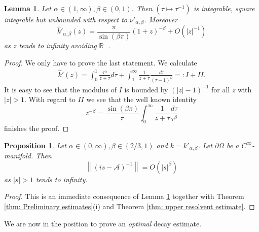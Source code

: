 \documentclass{amsart}
\newcommand{\abs}[1]{\left|#1\right|}
\newcommand{\norm}[1]{\left\| #1 \right\|}
\newcommand{\A}{\mathcal{A}}
\newcommand{\khat}{\hat{k}}
\newcommand{\R}{\mathbb{R}}
\newtheorem{Proposition}[Theorem]{Proposition}
\newtheorem{Lemma}[Theorem]{Lemma}
\begin{document}
  \begin{Lemma}\label{lem: visco kalphabeta}
   Let $\alpha\in(1,\infty),\beta\in(0,1)$. Then $(\tau\mapsto\tau^{-1})$ is integrable, square integrable but unbounded with respect to $\nu'_{\alpha,\beta}$. Moreover
   \begin{equation}\nonumber
    \khat'_{\alpha,\beta}(z) = \frac{\pi}{\sin(\beta\pi)} (1+z)^{-\beta} + O(\abs{z}^{-1})
   \end{equation}
   as $z$ tends to infinity avoiding $\R_-$.
  \end{Lemma}

  \begin{proof}
   We only have to prove the last statement. We calculate
   \begin{align*}
    \khat'(z) = \int_0^1 \frac{\tau^{\alpha}}{z+\tau} d\tau + \int_1^{\infty} \frac{1}{z+\tau} \frac{d\tau}{(\tau-1)^{\beta}} 
    =: I + II.
   \end{align*}
   It is easy to see that the modulus of $I$ is bounded by $(\abs{z}-1)^{-1}$ for all $z$ with $\abs{z} > 1$. With regard to $II$ we see that the well known identity 
   \begin{equation}\nonumber
    z^{-\beta} = \frac{\sin(\beta \pi)}{\pi} \int_0^{\infty} \frac{1}{z+\tau} \frac{d\tau}{\tau^{\beta}}
   \end{equation}
   finishes the proof.
  \end{proof}

  \begin{Proposition}\label{prop: visco singularity at infinity}
   Let $\alpha\in(0,\infty), \beta\in(2/3,1)$ and $k=k'_{\alpha,\beta}$. Let $\partial\Omega$ be a $C^\infty$-manifold. Then
   \begin{equation}\nonumber
    \norm{(is-\A)^{-1}} = O(\abs{s}^{\beta})
   \end{equation}
   as $\abs{s}>1$ tends to infinity.
  \end{Proposition}
  
  \begin{proof}
   This is an immediate consequence of Lemma \ref{lem: visco kalphabeta} together with Theorem \ref{thm: Preliminary estimates}(i) and Theorem \ref{thm: upper resolvent estimate}.
  \end{proof}
  
  We are now in the position to prove an \emph{optimal} decay estimate.
  
\end{document}
